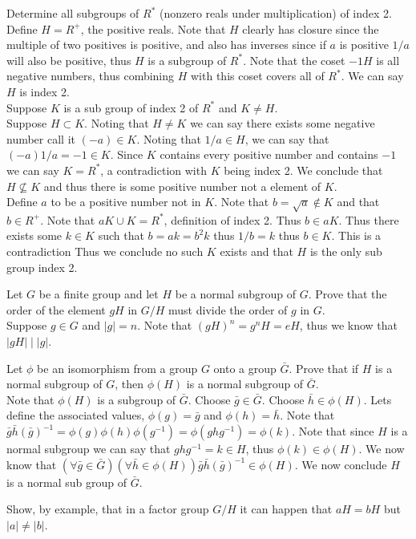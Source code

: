 \documentclass[12pt]{article}
\makeatletter
\theoremstyle{homework}
\newenvironment{exercise}[1]
{\def\@currentlabel{#1}\exercisecore}
{\endexercisecore}
\makeatother
\begin{document}
\begin{exercise}{9.36}
Determine all subgroups of $R^{*}$ (nonzero reals under multiplication) of index 2.\\
Define $H=R^+$, the positive reals.  Note that $H$ clearly has closure since the multiple of two positives is positive, and also has inverses since if $a$ is positive $1/a$ will also be positive, thus $H$ is a subgroup of $R^*$.  Note that the coset $-1H$ is all negative numbers, thus combining $H$ with this coset covers all of $R^*$.  We can say $H$ is index 2.\\
Suppose $K$ is a sub group of index 2 of $R^*$ and $K\neq H$.\\
Suppose $H\subset K$.  Noting that $H\neq K$ we can say there exists some negative number call it $(-a)\in K$.  Noting that $1/a\in H$, we can say that $(-a)1/a=-1\in K$.  Since $K$ contains every positive number and contains $-1$ we can say $K=R^*$, a contradiction with $K$ being index 2.  We conclude that $H\not\subseteq K$ and thus there is some positive number not a element of $K$.\\
Define $a$ to be a positive number not in $K$.  Note that $b=\sqrt{a}\not\in K$ and that $b\in R^+$.  Note that $aK\cup K=R^*$, definition of index 2.  Thus $b\in aK$.  Thus there exists some $k\in K$ such that $b=ak=b^2k$ thus $1/b=k$ thus $b\in K$.  This is a contradiction Thus we conclude no such $K$ exists and that $H$ is the only sub group index 2.
\end{exercise}

\begin{exercise}{9.37}
Let $G$ be a finite group and let $H$ be a normal subgroup of $G$.  Prove that the order of the element $gH$ in $G/H$ must divide the order of $g$ in $G$.\\
Suppose $g\in G$ and $|g|=n$.  Note that $(gH)^n=g^nH=eH$, thus we know that $|gH|\mid |g|$.
\end{exercise}

\begin{exercise}{9.40}
Let $\phi$ be an isomorphism from a group $G$ onto a group $\bar{G}$. Prove that if $H$ is a normal subgroup of $G$, then $\phi(H)$ is a normal subgroup of $\bar{G}$.\\
Note that $\phi(H)$ is a subgroup of $\bar{G}$.  Choose $\bar{g}\in\bar{G}$.  Choose $\bar{h}\in \phi(H)$.  Lets define the associated values, $\phi(g)=\bar{g}$ and $\phi(h)=\bar{h}$.  Note that $\bar{g}\bar{h}(\bar{g})^{-1}=\phi(g)\phi(h)\phi(g^{-1})=\phi(ghg^{-1})=\phi(k)$.  Note that since $H$ is a normal subgroup we can say that $ghg^{-1}=k\in H$, thus $\phi(k)\in\phi(H)$.  We now know that $(\forall \bar{g}\in\bar{G}) (\forall \bar{h}\in \phi(H)) \bar{g}\bar{h}(\bar{g})^{-1}\in \phi(H)$.  We now conclude $H$ is a normal sub group of $\bar{G}$.
\end{exercise}

\begin{exercise}{9.43}
Show, by example, that in a factor group $G/H$ it can happen that $aH = bH$ but $|a| \neq |b|$.
\end{exercise}

\begin{exercise}{9.50}

\end{exercise}

\begin{exercise}{9.58}

\end{exercise}
\end{document}
